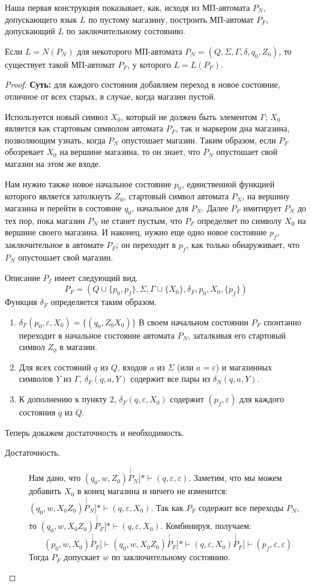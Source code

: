 \documentclass[a4paper,12pt]{article}
\begin{document}
Наша первая конструкция показывает, как, исходя из МП-автомата $P_N$, допускающего язык $L$ по пустому магазину, построить МП-автомат $P_F$, допускающий $L$ по заключительному состоянию.
\begin{theorem}
	Если $L = N(P_N)$ для некоторого МП-автомата $P_N = (Q, \Sigma, \Gamma, \delta, q_0, Z_0)$, то существует такой МП-автомат $P_F$, у которого $L = L(P_F)$.
\end{theorem}
\begin{proof}
	\textbf{Суть:} для каждого состояния добавляем переход в новое состояние, отличное от всех старых, в случае, когда магазин пустой.
	
	Используется новый символ $X_0$, который не должен быть элементом $\Gamma$; $X_0$ является как стартовым символом автомата $P_F$, так и маркером дна магазина, позволяющим узнать, когда $P_N$ опустошает магазин. Таким образом, если $P_F$ обозревает $X_0$ на вершине магазина, то он знает, что $P_N$ опустошает свой магазин на этом же входе.
	
	Нам нужно также новое начальное состояние $p_0$, единственной функцией которого является затолкнуть $Z_0$, стартовый символ автомата $P_N$, на вершину магазина и перейти в состояние $q_0$, начальное для $P_N$. Далее $P_F$ имитирует $P_N$ до тех пор, пока магазин $P_N$ не станет пустым, что $P_F$ определяет по символу $X_0$ на вершине своего магазина. И наконец, нужно еще одно новое состояние $p_f$, заключительное в автомате $P_F$; он переходит в $p_f$, как только обнаруживает, что $P_N$ опустошает свой магазин.
	
	Описание $P_f$ имеет следующий вид.
	\[P_F = \left(Q \cup \{p_0, p_f\}, \Sigma, \Gamma \cup \{X_0\}, \delta_F, p_0, X_0, \{p_f\}\right)\]
Функция $\delta_F$ определяется таким образом.
\begin{enumerate}
	\item $\delta_F(p_0, \varepsilon, X_0) = \{(q_0, Z_0X_0)\}$ В своем начальном состоянии $P_F$ спонтанно переходит в
	начальное состояние автомата $P_N$, заталкивая его стартовый символ $Z_0$ в магазин.
	\item Для всех состояний $q$ из $Q$, входов $a$ из $\Sigma$ (или $a = \varepsilon$) и магазинных символов $Y$ из $\Gamma$, $\delta_F(q, a, Y)$ содержит все пары из $\delta_N(q, a, Y)$.
	\item К дополнению к пункту 2, $\delta_F(q, \varepsilon, X_0)$ содержит $(p_f, \varepsilon)$ для каждого состояния $q$ из $Q$.
\end{enumerate}
Теперь докажем достаточность и необходимость.
\begin{description}
	\item[Достаточность.] Нам дано, что $(q_0, w, Z_0) \stackrel[P_N]{*}{\vdash} (q, \varepsilon, \varepsilon)$. Заметим, что мы можем добавить $X_0$ в конец магазина и ничего не изменится: $(q_0, w, X_0Z_0) \stackrel[P_N]{*}{\vdash} (q, \varepsilon, X_0)$. Так как $P_F$ содержит все переходы $P_N$, то $(q_0, w, X_0Z_0) \stackrel[P_F]{*}{\vdash} (q, \varepsilon, X_0)$. Комбинируя, получаем:
	\[(p_0, w, X_0) \stackrel[P_F]{}{\vdash} (q_0, w, X_0Z_0)  \stackrel[P_F]{*}{\vdash} (q, \varepsilon, X_0) \stackrel[P_F]{}{\vdash} (p_f, \varepsilon, \varepsilon)\]
	Тогда $P_F$ допускает $w$ по заключительному состоянию.
	

\end{description}
\end{proof}
\end{document}
